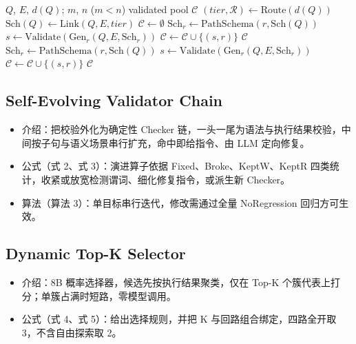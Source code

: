 \begin{algorithm}[t]
\caption{Difficulty-routed two-stage generation.}
\label{alg:generation}
\begin{algorithmic}[1]
\Require $Q$, $E$, $d(Q)$; $m$, $n$ ($m < n$)
\Ensure validated pool $\mathcal{C}$
\State $(\mathit{tier}, \mathcal{R}) \gets \mathrm{Route}(d(Q))$
\State $\mathrm{Sch}(Q) \gets \mathrm{Link}(Q, E, \mathit{tier})$
\State $\mathcal{C} \gets \emptyset$
 
  \State $\mathrm{Sch}_r \gets \mathrm{PathSchema}(r, \mathrm{Sch}(Q))$
    \State $s \gets \mathrm{Validate}(\mathrm{Gen}_r(Q, E, \mathrm{Sch}_r))$
      \State $\mathcal{C} \gets \mathcal{C} \cup \{(s, r)\}$
    \EndIf
  \EndFor
\EndFor
{}
  \State \Return $\mathcal{C}$
\EndIf
{} 
  \State $\mathrm{Sch}_r \gets \mathrm{PathSchema}(r, \mathrm{Sch}(Q))$
    \State $s \gets \mathrm{Validate}(\mathrm{Gen}_r(Q, E, \mathrm{Sch}_r))$
      \State $\mathcal{C} \gets \mathcal{C} \cup \{(s, r)\}$
    \EndIf
  \EndFor
\EndFor
\State \Return $\mathcal{C}$
\end{algorithmic}
\end{algorithm}

\subsection{Self-Evolving Validator Chain}
\label{sec:validator}

\begin{zhoutline}
\begin{itemize}
\item 介绍：把校验外化为确定性 Checker 链，一头一尾为语法与执行结果校验，中间按子句与语义场景串行扩充，命中即给指令、由 LLM 定向修复。
\item 公式（式 2、式 3）：演进算子依据 Fixed、Broke、KeptW、KeptR 四类统计，收紧或放宽检测谓词、细化修复指令，或派生新 Checker。
\item 算法（算法 3）：单目标串行迭代，修改需通过全量 NoRegression 回归方可生效。
\end{itemize}
\end{zhoutline}

\subsection{Dynamic Top-K Selector}
\label{sec:selector}

\begin{zhoutline}
\begin{itemize}
\item 介绍：8B 概率选择器，候选先按执行结果聚类，仅在 Top-K 个簇代表上打分；单簇占满时短路，零模型调用。
\item 公式（式 4、式 5）：给出选择规则，并把 K 与回路组合绑定，四路全开取 3，不含自由探索取 2。
\end{itemize}
\end{zhoutline}
